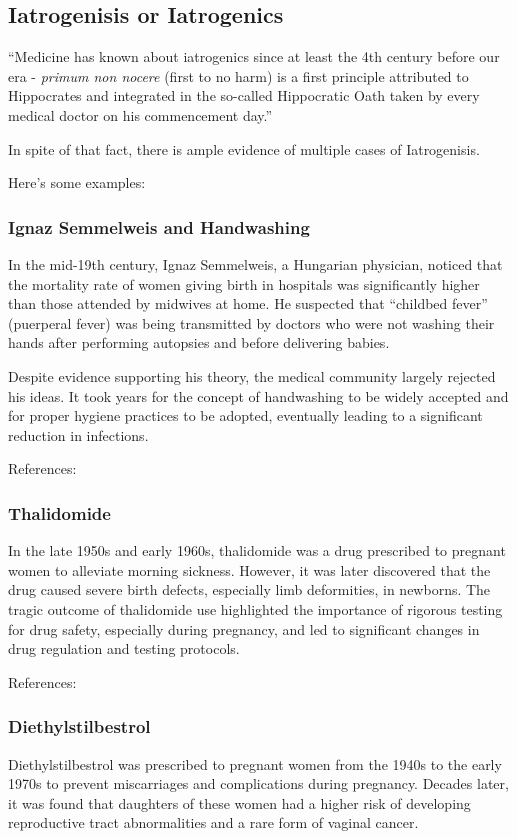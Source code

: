 \subsection{Iatrogenisis or Iatrogenics}

``Medicine has known about iatrogenics since at least the 4th century before our era - \emph{primum non nocere} (first to no harm) is a first principle attributed to Hippocrates and integrated in the so-called Hippocratic Oath taken by every medical doctor on his commencement day.''\cite{Taleb2012}

In spite of that fact, there is ample evidence of multiple cases of Iatrogenisis. \cite{VarleyVarma2021}

Here's some examples:

\subsubsection{Ignaz Semmelweis and Handwashing}

In the mid-19th century, Ignaz Semmelweis, a Hungarian physician, noticed that the mortality rate of women giving birth in hospitals was significantly higher than those attended by midwives at home. He suspected that  ``childbed fever'' (puerperal fever) was being transmitted by doctors who were not washing their hands after performing autopsies and before delivering babies.

Despite evidence supporting his theory, the medical community largely rejected his ideas. It took years for the concept of handwashing to be widely accepted and for proper hygiene practices to be adopted, eventually leading to a significant reduction in infections.

References: \cite{Semmelweis2006}

\subsubsection{Thalidomide}
In the late 1950s and early 1960s, thalidomide was a drug prescribed to pregnant women to alleviate morning sickness. However, it was later discovered that the drug caused severe birth defects, especially
limb deformities, in newborns. The tragic outcome of thalidomide use highlighted the importance of rigorous testing for drug safety, especially during pregnancy, and led to significant changes in drug
regulation and testing protocols.

References: \cite{WGMcbride}

\subsubsection{Diethylstilbestrol}
Diethylstilbestrol was prescribed to pregnant women from the 1940s to the early 1970s to prevent miscarriages and complications during pregnancy. Decades later, it was found that daughters of these women
had a higher risk of developing reproductive tract abnormalities and a rare form of vaginal cancer.

